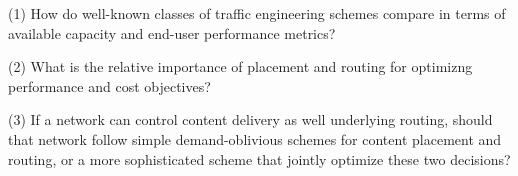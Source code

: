 (1) How do well-known classes of traffic engineering schemes compare in terms of available capacity and end-user performance metrics?

(2) What is the relative importance of placement and routing for optimizng performance and cost objectives?

(3) If a network can control content delivery as well underlying routing, should that network follow simple demand-oblivious schemes for content placement and routing, or a more sophisticated scheme that jointly optimize these two decisions?


